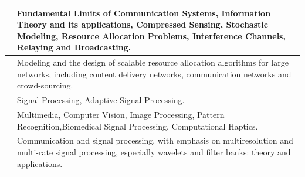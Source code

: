 \documentclass[openany]{book} %
\begin{document}
\begin{tabular}{p{4.5cm} p{9cm}}
\href{https://www.ee.iitb.ac.in/wiki/faculty/bsraj}{\color{blue}{Prof. Sibi Raj B Pillai  }} & Fundamental Limits of Communication Systems, Information Theory and its applications, Compressed Sensing, Stochastic Modeling, Resource Allocation Problems, Interference Channels, Relaying and Broadcasting. \\ 
\hline 

\href{https://sites.google.com/site/sharayumoharir/}{\color{blue}{Prof. Sharayu Moharir }} & Modeling and the design of scalable resource allocation algorithms for large networks, including content delivery networks, communication
networks and crowd-sourcing. \\ 
\hline 

\href{https://www.ee.iitb.ac.in/wiki/faculty/merchant}{\color{blue}{Prof. Shabbir Merchant }} & Signal Processing, Adaptive Signal Processing. \\ 
\hline 

\href{https://www.ee.iitb.ac.in/~sc/}{\color{blue}{Prof. Subhasis Chaudhuri}} & Multimedia, Computer Vision, Image Processing, Pattern Recognition,Biomedical Signal Processing, Computational Haptics. \\ 
\hline 

\href{https://www.ee.iitb.ac.in/wiki/faculty/vmgadre}{\color{blue}{Prof. Vikram M. Gadre }} & Communication and signal processing, with emphasis on multiresolution
and multi-rate signal processing, especially wavelets and filter banks:
theory and applications. \\ 
\hline
\end{tabular} 

\end{document}
